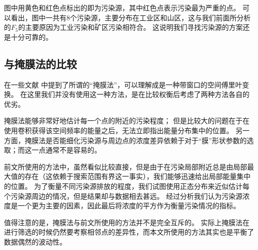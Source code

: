 \documentclass[a4paper]{article}
\begin{document}
图中用黄色和红色点标出的即为污染源，其中红色点表示污染最为严重的点。
可以看出，图中一共有8个污染源，主要分布在工业区和山区，这与我们前面所分析的$F_5$的主要原因为工业污染和矿区污染相符合。
这说明我们寻找污染源的方案还是十分可靠的。
\subsection{与掩膜法的比较}
在一些文献 \cite{GEAN:GEAN338} \cite{mitchell_2012} 中提到了所谓的“掩膜法”，可以理解成是一种带窗口的空间傅里叶变换。
在这里我们并没有使用这一种方法，是在比较权衡后考虑了两种方法各自的优劣。

掩膜法能够非常好地估计每一个点的附近的污染程度；
但是比较大的问题在于在使用卷积获得该空间频率的能量之后，无法立即指出能量分布集中的位置。
另一方面，掩膜法是否能细化污染源与周边点的浓度差异依赖于对于“膜”形状参数的选取；而这一点通常不是容易的。

前文所使用的方法中，虽然看似比较直接，但是由于在污染局部附近总是由局部最大值的存在（这依赖于搜索范围有界这一事实），我们能够迅速给出局部能量集中的位置。
为了衡量不同污染源排放的程度，我们试图使用正态分布来近似估计每个污染源周边的情况，但是结果却与数据相去甚远。
经过分析我们认为污染源浓度是一个更为主要的因素，因此最后将浓度的平方作为衡量污染情况的指标。

值得注意的是，掩膜法与前文所使用的方法并不是完全互斥的。
实际上掩膜法在进行筛选的时候仍然要考察相邻点的差异性，而本文所使用的方法其实也是平衡了数据偶然的波动性。
\end{document}

